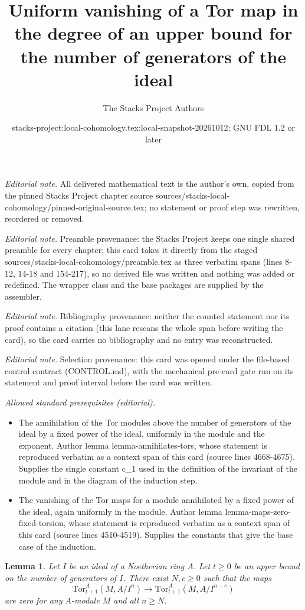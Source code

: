 \documentclass[10pt,a4paper]{amsart}
\title{Uniform vanishing of a Tor map in the degree of an upper bound for the number of generators of the ideal}
\author{The Stacks Project Authors}
\date{stacks-project:local-cohomology.tex:local-snapshot-20261012; GNU FDL 1.2 or later}
\theoremstyle{plain}
\newtheorem{lemma}[subsection]{Lemma}
\theoremstyle{definition}
\theoremstyle{remark}
\numberwithin{equation}{subsection}
\begin{document}
\maketitle
\noindent\textit{Editorial note.} All delivered mathematical text is the author's own, copied from the pinned Stacks Project chapter source sources/stacks-local-cohomology/pinned-original-source.tex; no statement or proof step was rewritten, reordered or removed.\par\medskip
\noindent\textit{Editorial note.} Preamble provenance: the Stacks Project keeps one single shared preamble for every chapter; this card takes it directly from the staged sources/stacks-local-cohomology/preamble.tex as three verbatim spans (lines 8-12, 14-18 and 154-217), so no derived file was written and nothing was added or redefined. The wrapper class and the base packages are supplied by the assembler.\par\medskip
\noindent\textit{Editorial note.} Bibliography provenance: neither the counted statement nor its proof contains a citation (this lane rescans the whole span before writing the card), so the card carries no bibliography and no entry was reconstructed.\par\medskip
\noindent\textit{Editorial note.} Selection provenance: this card was opened under the file-based control contract (CONTROL.md), with the mechanical pre-card gate run on its statement and proof interval before the card was written.\par\medskip
\noindent\textit{Allowed standard prerequisites (editorial).}\begin{itemize}
\item The annihilation of the Tor modules above the number of generators of the ideal by a fixed power of the ideal, uniformly in the module and the exponent. Author lemma lemma-annihilates-tors, whose statement is reproduced verbatim as a context span of this card (source lines 4668-4675). Supplies the single constant c\_1 used in the definition of the invariant of the module and in the diagram of the induction step.
\item The vanishing of the Tor maps for a module annihilated by a fixed power of the ideal, again uniformly in the module. Author lemma lemma-maps-zero-fixed-torsion, whose statement is reproduced verbatim as a context span of this card (source lines 4510-4519). Supplies the constants that give the base case of the induction.
\end{itemize}\medskip
\begin{lemma}
\label{lemma-tor-maps-vanish}
Let $I$ be an ideal of a Noetherian ring $A$. Let $t \geq 0$
be an upper bound on the number of generators of $I$.
There exist $N, c \geq 0$ such that the maps
$$
\text{Tor}_{t + 1}^A(M, A/I^n) \to \text{Tor}_{t + 1}^A(M, A/I^{n - c})
$$
are zero for any $A$-module $M$ and all $n \geq N$.
\end{lemma}
\end{document}
